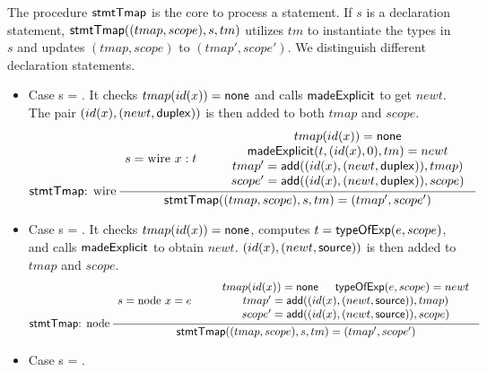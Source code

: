 The procedure ${\sf stmtTmap}$ %
is the core to process a statement. %
%
If $s$ is a declaration statement, ${\sf stmtTmap}((tmap, scope), s, tm)$ utilizes $tm$ to instantiate the types in $s$ and updates $(tmap, scope)$ to $(tmap', scope')$. We distinguish different declaration statements.
\begin{itemize}
	\item Case s = . It checks $tmap(id(x)) = {\sf none}$ and calls ${\sf madeExplicit}$ %
	to get $newt$. The pair $(id(x), (newt, {\sf duplex}))$ is then added to both $tmap$ and $scope$. %
	\[
			\inferii[\stmttmap: wire]
			{\seqq{\stmttmap((tmap, scope), s, tm) = (tmap', scope')}}
			{
					\seqq{s = \mbox{wire } x: t}
				}
			{
					\begin{array}{c}
							tmap(id(x)) = \svnone   \\
							\madeexplicit(t, (id(x),0), tm) = newt  \\
							tmap' = \fadd((id(x), (newt, \duplex)), tmap) \\
							scope' = \fadd((id(x), (newt, \duplex)), scope)
						\end{array}
				}
	\]
	\item Case s = . It checks $tmap(id(x)) = {\sf none}$, computes $t= {\sf typeOfExp}(e, scope)$, and calls ${\sf madeExplicit}$
	to obtain $newt$. $(id(x), (newt, {\sf source}))$ is then added to $tmap$ and $scope$. %
\[
	\inferii[\stmttmap: node]
{\seqq{\stmttmap((tmap, scope), s, tm) = (tmap', scope')}}
{\seqq{s = \mbox{node } x = e} }
{
	\begin{array}{c}
		tmap(id(x)) = \svnone  \hspace{15pt} \typeofexp(e, scope) = newt  \\
		tmap' = \fadd((id(x), (newt, \source)), tmap)  \\
		scope' = \fadd((id(x), (newt, \source)), scope)
	\end{array}
}
\]
\item Case s = .
	

\end{itemize}
